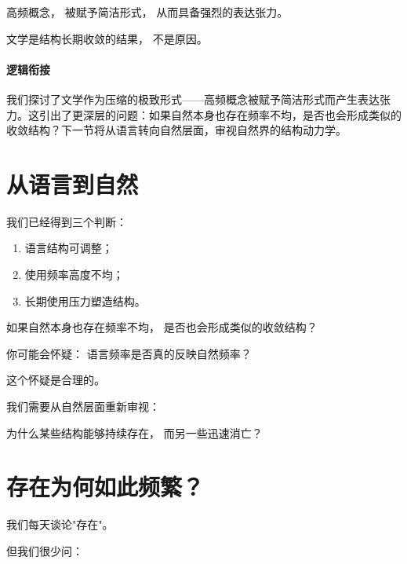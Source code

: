 \documentclass[openany, a4paper, 12pt]{book}
\begin{document}
高频概念，
被赋予简洁形式，
从而具备强烈的表达张力。

文学是结构长期收敛的结果，
不是原因。

\paragraph*{逻辑衔接}
我们探讨了文学作为压缩的极致形式——高频概念被赋予简洁形式而产生表达张力。这引出了更深层的问题：如果自然本身也存在频率不均，是否也会形成类似的收敛结构？下一节将从语言转向自然层面，审视自然界的结构动力学。


\section{从语言到自然}

我们已经得到三个判断：

\begin{enumerate}
	\item 语言结构可调整；
	\item 使用频率高度不均；
	\item 长期使用压力塑造结构。
\end{enumerate}

\begin{questionbox}
	如果自然本身也存在频率不均，
	是否也会形成类似的收敛结构？
\end{questionbox}

\begin{tcolorbox}[colback=yellow!5,title=\textit{读者行为预测}]
	你可能会怀疑：
	语言频率是否真的反映自然频率？
\end{tcolorbox}

这个怀疑是合理的。

我们需要从自然层面重新审视：

为什么某些结构能够持续存在，
而另一些迅速消亡？


\section{存在为何如此频繁？}

我们每天谈论"存在"。

但我们很少问：
\end{document}

